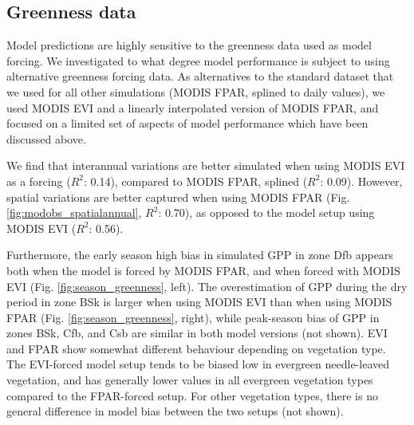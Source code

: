 \documentclass{myreport}
\newcommand{\rsq}{$R^2$}
\begin{document}
\subsection{Greenness data}
\label{sec:results_greenness}

Model predictions are highly sensitive to the greenness data used as model forcing. We investigated to what degree model performance is subject to using alternative greenness forcing data. As alternatives to the standard dataset that we used for all other simulations (MODIS FPAR, splined to daily values), we used MODIS EVI and a linearly interpolated version of MODIS FPAR, and focused on a limited set of aspects of model performance which have been discussed above.

We find that interannual variations are better simulated when using MODIS EVI as a forcing (\rsq : 0.14), compared to MODIS FPAR, splined (\rsq : 0.09). However, spatial variations are better captured when using MODIS FPAR (Fig. \ref{fig:modobs_spatialannual}, \rsq : 0.70), as opposed to the model setup using MODIS EVI (\rsq : 0.56). 

Furthermore, the early season high bias in simulated GPP in zone Dfb appears both when the model is forced by MODIS FPAR, and when forced with MODIS EVI (Fig. \ref{fig:season_greenness}, left). The overestimation of GPP during the dry period in zone BSk is larger when using MODIS EVI than when using MODIS FPAR (Fig. \ref{fig:season_greenness}, right), while peak-season bias of GPP in zones BSk, Cfb, and Csb are similar in both model versions (not shown). EVI and FPAR show somewhat different behaviour depending on vegetation type. The EVI-forced model setup tends to be biased low in evergreen needle-leaved vegetation, and has generally lower values in all evergreen vegetation types compared to the FPAR-forced setup. For other vegetation types, there is no general difference in model bias between the two setups (not shown).
\end{document}
